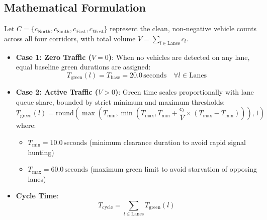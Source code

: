 \subsection{Mathematical Formulation}
Let $C = \{c_{\text{North}}, c_{\text{South}}, c_{\text{East}}, c_{\text{West}}\}$ represent the clean, non-negative vehicle counts across all four corridors, with total volume $V = \sum_{l \in \text{Lanes}} c_l$.
\begin{itemize}[leftmargin=*]
    \item \textbf{Case 1: Zero Traffic ($V = 0$)}:
    When no vehicles are detected on any lane, equal baseline green durations are assigned:
    \begin{equation}
    T_{\text{green}}(l) = T_{\text{base}} = 20.0\,\text{seconds} \quad \forall l \in \text{Lanes}
    \end{equation}
    \item \textbf{Case 2: Active Traffic ($V > 0$)}:
    Green time scales proportionally with lane queue share, bounded by strict minimum and maximum thresholds:
    \begin{equation}
    T_{\text{green}}(l) = \text{round}\left( \max\left(T_{\text{min}}, \min\left(T_{\text{max}}, T_{\text{min}} + \frac{c_l}{V} \times (T_{\text{max}} - T_{\text{min}})\right)\right), 1 \right)
    \end{equation}
    where:
    \begin{itemize}
        \item $T_{\text{min}} = 10.0\,\text{seconds}$ (minimum clearance duration to avoid rapid signal hunting)
        \item $T_{\text{max}} = 60.0\,\text{seconds}$ (maximum green limit to avoid starvation of opposing lanes)
    \end{itemize}
    \item \textbf{Cycle Time}:
    \begin{equation}
    T_{\text{cycle}} = \sum_{l \in \text{Lanes}} T_{\text{green}}(l)
    \end{equation}
\end{itemize}

